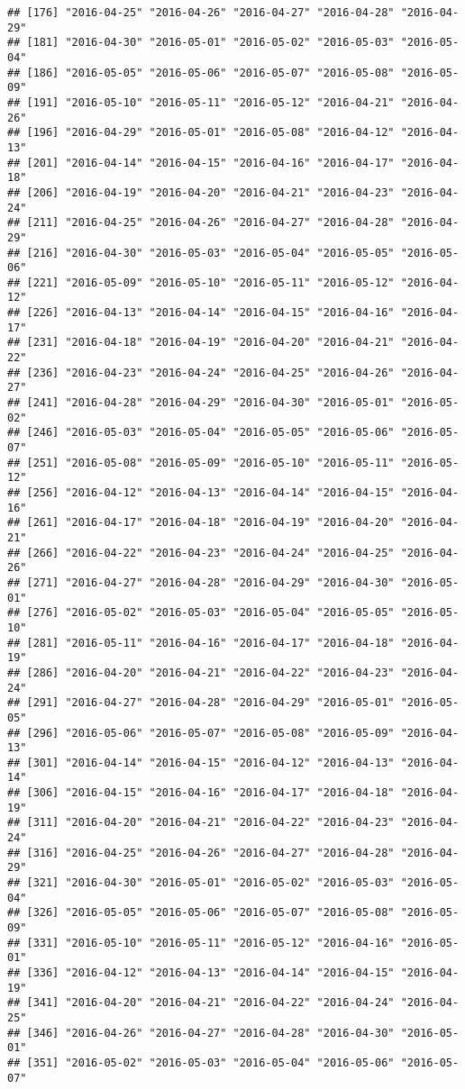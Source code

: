 \documentclass[
]{article}
\begin{document}
\begin{verbatim}
## [176] "2016-04-25" "2016-04-26" "2016-04-27" "2016-04-28" "2016-04-29"
## [181] "2016-04-30" "2016-05-01" "2016-05-02" "2016-05-03" "2016-05-04"
## [186] "2016-05-05" "2016-05-06" "2016-05-07" "2016-05-08" "2016-05-09"
## [191] "2016-05-10" "2016-05-11" "2016-05-12" "2016-04-21" "2016-04-26"
## [196] "2016-04-29" "2016-05-01" "2016-05-08" "2016-04-12" "2016-04-13"
## [201] "2016-04-14" "2016-04-15" "2016-04-16" "2016-04-17" "2016-04-18"
## [206] "2016-04-19" "2016-04-20" "2016-04-21" "2016-04-23" "2016-04-24"
## [211] "2016-04-25" "2016-04-26" "2016-04-27" "2016-04-28" "2016-04-29"
## [216] "2016-04-30" "2016-05-03" "2016-05-04" "2016-05-05" "2016-05-06"
## [221] "2016-05-09" "2016-05-10" "2016-05-11" "2016-05-12" "2016-04-12"
## [226] "2016-04-13" "2016-04-14" "2016-04-15" "2016-04-16" "2016-04-17"
## [231] "2016-04-18" "2016-04-19" "2016-04-20" "2016-04-21" "2016-04-22"
## [236] "2016-04-23" "2016-04-24" "2016-04-25" "2016-04-26" "2016-04-27"
## [241] "2016-04-28" "2016-04-29" "2016-04-30" "2016-05-01" "2016-05-02"
## [246] "2016-05-03" "2016-05-04" "2016-05-05" "2016-05-06" "2016-05-07"
## [251] "2016-05-08" "2016-05-09" "2016-05-10" "2016-05-11" "2016-05-12"
## [256] "2016-04-12" "2016-04-13" "2016-04-14" "2016-04-15" "2016-04-16"
## [261] "2016-04-17" "2016-04-18" "2016-04-19" "2016-04-20" "2016-04-21"
## [266] "2016-04-22" "2016-04-23" "2016-04-24" "2016-04-25" "2016-04-26"
## [271] "2016-04-27" "2016-04-28" "2016-04-29" "2016-04-30" "2016-05-01"
## [276] "2016-05-02" "2016-05-03" "2016-05-04" "2016-05-05" "2016-05-10"
## [281] "2016-05-11" "2016-04-16" "2016-04-17" "2016-04-18" "2016-04-19"
## [286] "2016-04-20" "2016-04-21" "2016-04-22" "2016-04-23" "2016-04-24"
## [291] "2016-04-27" "2016-04-28" "2016-04-29" "2016-05-01" "2016-05-05"
## [296] "2016-05-06" "2016-05-07" "2016-05-08" "2016-05-09" "2016-04-13"
## [301] "2016-04-14" "2016-04-15" "2016-04-12" "2016-04-13" "2016-04-14"
## [306] "2016-04-15" "2016-04-16" "2016-04-17" "2016-04-18" "2016-04-19"
## [311] "2016-04-20" "2016-04-21" "2016-04-22" "2016-04-23" "2016-04-24"
## [316] "2016-04-25" "2016-04-26" "2016-04-27" "2016-04-28" "2016-04-29"
## [321] "2016-04-30" "2016-05-01" "2016-05-02" "2016-05-03" "2016-05-04"
## [326] "2016-05-05" "2016-05-06" "2016-05-07" "2016-05-08" "2016-05-09"
## [331] "2016-05-10" "2016-05-11" "2016-05-12" "2016-04-16" "2016-05-01"
## [336] "2016-04-12" "2016-04-13" "2016-04-14" "2016-04-15" "2016-04-19"
## [341] "2016-04-20" "2016-04-21" "2016-04-22" "2016-04-24" "2016-04-25"
## [346] "2016-04-26" "2016-04-27" "2016-04-28" "2016-04-30" "2016-05-01"
## [351] "2016-05-02" "2016-05-03" "2016-05-04" "2016-05-06" "2016-05-07"

\end{verbatim}
\end{document}
